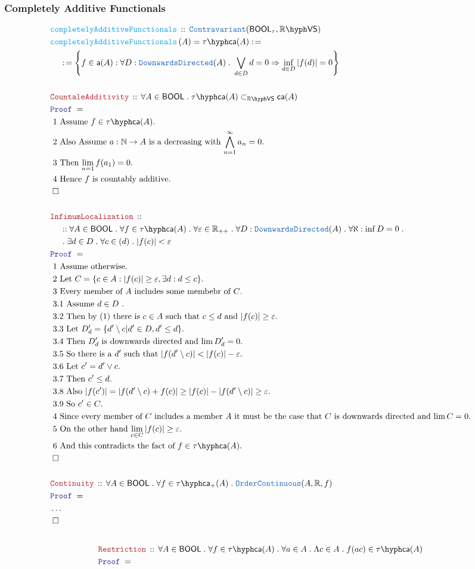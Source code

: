 \documentclass[12pt]{scrartcl}
\newcommand{\TYPE}[1]{\textcolor{NavyBlue}{\mathtt{#1}}}
\newcommand{\FUNC}[1]{\textcolor{Cerulean}{\mathtt{#1}}}
\newcommand{\LOGIC}[1]{\textcolor{Blue}{\mathtt{#1}}}
\newcommand{\THM}[1]{\textcolor{Maroon}{\mathtt{#1}}}
\renewcommand{\.}{\; . \;}
\newcommand{\de}{: \kern 0.1pc =}
\newcommand{\Act}[1]{\left( #1 \right)}
\newcommand{\Theorem}[2]{& \THM{#1} \, :: \, #2 \\ & \Proof = \\ }
\newcommand{\DeclareFunc}[2]{& \FUNC{#1} \, :: \, #2 \\}
\newcommand{\DefineNamedFunc}[4]{&  \FUNC{#1}\Act{#2} = #3 \de #4 \\}
\newcommand{\NewLine}{\\ & \kern 1pc}
\newcommand{\Page}[1]{ \begin{align*} #1 \end{align*}   }
\newcommand{\NoProof}{ & \ldots \\ \EndProof}
\newcommand{\Imply}{\Rightarrow}
\newcommand{\Reals}{\mathbb{R} }
\newcommand{\Nat}{\mathbb{N} }
\newcommand{\QED}{\; \square}
\newcommand{\EndProof}{& \QED \\}
\newcommand{\Proof}{\LOGIC{Proof} \; }
\newcommand{\Explain}[1]{& \text{#1.} \\}
\newcommand{\Contra}{\TYPE{Contravariant}}
\newcommand{\oC}{\TYPE{OrderContinuous}}
\newcommand{\BOOL}{\mathsf{BOOL}}
\newcommand{\subvec}[1]{\subset_{\VS{#1}}}%
\newcommand{\VS}[1]{#1\hyph\mathsf{VS}} %
\newcommand{\caf}{\mathsf{ca}}
\newcommand{\af}{\mathsf{a}}
\newcommand{\Caf}{\tau\hyph\mathsf{ca}}
\begin{document}
\subsubsection{Completely Additive Functionals}
\Page{
	\DeclareFunc{completelyAdditiveFunctionals}
	{
		\Contra(\BOOL_\tau, \VS{\Reals})
	}
	\DefineNamedFunc{completelyAdditiveFunctionals}{A}{\Caf(A)}
	{
		\NewLine \de
		\left\{ 
			f \in \af(A) : \forall D : \TYPE{DownwardsDirected}(A) \.
			\bigvee_{d \in D} d = 0 \Imply \inf_{d \in D}  |f(d)| = 0 
		\right\} 
	}
	\\
	\Theorem{CountaleAdditivity}
	{
		\forall A \in \BOOL \. \Caf(A) \subvec{\Reals} \caf(A)
	}
	\Explain{ 1 Assume $f \in \Caf(A)$}
	\Explain{ 2 Also Assume $a : \Nat \to A$ is a decreasing with $\bigwedge^\infty_{n=1} a_n = 0$}
	\Explain{ 3 Then $\lim_{n =1} f(a_1) = 0$}
	\Explain{ 4 Hence $f$ is countably additive}
	\EndProof
	\\
	\Theorem{InfimumLocalization}
	{
		\NewLine ::		
		\forall A \in \BOOL \.
		\forall f \in \Caf(A) \.
		\forall \varepsilon \in \Reals_{++} \.
		\forall D : \TYPE{DownwardsDirected}(A) \.
		\forall \aleph : \inf D =  0 \. \NewLine \.
		\exists d \in D \.
		\forall c \in (d) \.
		|f(c)| < \varepsilon
	}
	\Explain{ 1 Assume otherwise}	
	\Explain{ 2 Let $C = \{ c \in A : |f(c)| \ge \varepsilon, \exists d : d \le c \}$}
	\Explain{ 3 Every member of $A$ includes some membebr of $C$}	
	\Explain{ 3.1 Assume $d \in D$ }
	\Explain{ 3.2 Then by $(1)$ there is $c \in A$ such that $c \le d$ and $|f(c)| \ge \varepsilon$}
	\Explain{ 3.3 Let $D'_d = \{ d'\setminus c |  d' \in D, d' \le d \}$}
	\Explain{ 3.4 Then $D'_d$ is downwards directed and $\lim D'_d = 0$}
	\Explain{ 3.5 So there is a $d'$ such that $|f(d'\setminus c)| <  |f(c)| - \varepsilon $}
	\Explain{ 3.6 Let $c' = d' \vee c$}
	\Explain{ 3.7 Then $c' \le d$}
	\Explain{ 3.8 Also $|f(c')| = | f(d' \setminus c)  + f(c)| \ge |f(c)| - |f(d' \setminus c)|  \ge \varepsilon$}
	\Explain{ 3.9 So $c' \in C$}
	\Explain{ 4 Since every member of $C$ includes a member $A$ 
		it must be the case that $C$ is downwards directed and $\lim C = 0$}
	\Explain{ 5 On the other hand $\lim_{c \in C} |f(c)| \ge \varepsilon$}
	\Explain{ 6 And this contradicts the fact of $f \in \Caf(A)$}
	\EndProof
	\\
	\Theorem{Continuity}
	{
		\forall A \in \BOOL \. 
		\forall f \in \Caf_+(A) \. 
		\oC(A,\Reals, f) 
	}
	\NoProof
	\\
}\Page{
	\Theorem{Restriction}
	{
		\forall A \in \BOOL \.
		\forall f \in \Caf(A) \.
		\forall a \in A \.
		\Lambda c \in A \. f(ac)  \in \Caf(A)
}}
\end{document}
